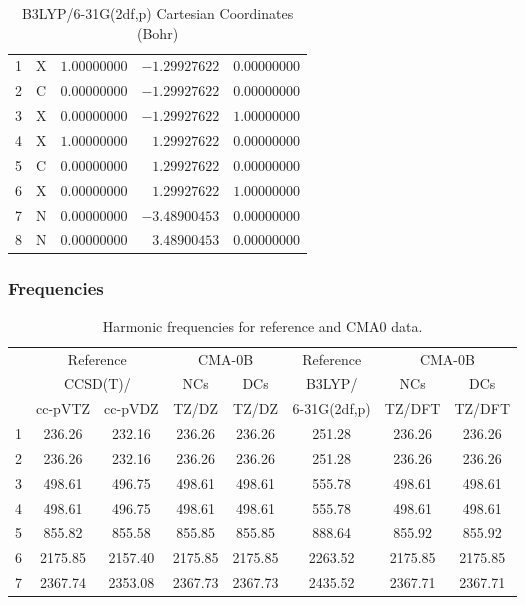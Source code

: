 \documentclass[10pt,oneside]{article}
\begin{document}
\begin{table}[h!]
\centering
\caption{B3LYP/6-31G(2df,p) Cartesian Coordinates (Bohr)}
\begin{tabular}{llrrr}
1  & X  & $ 1.00000000$ & $-1.29927622$ & $ 0.00000000$ \\
2  & C  & $ 0.00000000$ & $-1.29927622$ & $ 0.00000000$ \\
3  & X  & $ 0.00000000$ & $-1.29927622$ & $ 1.00000000$ \\
4  & X  & $ 1.00000000$ & $ 1.29927622$ & $ 0.00000000$ \\
5  & C  & $ 0.00000000$ & $ 1.29927622$ & $ 0.00000000$ \\
6  & X  & $ 0.00000000$ & $ 1.29927622$ & $ 1.00000000$ \\
7  & N  & $ 0.00000000$ & $-3.48900453$ & $ 0.00000000$ \\
8  & N  & $ 0.00000000$ & $ 3.48900453$ & $ 0.00000000$ \\
\end{tabular}
\end{table}

\clearpage

\subsubsection*{Frequencies}
\begin{table}[h!]
\centering
\caption{Harmonic frequencies for reference and CMA0 data.}
\begin{tabular}{cccccccc}
\toprule
{} & \multicolumn{2}{c}{Reference} & \multicolumn{2}{c}{CMA-0B} &    Reference & \multicolumn{2}{c}{CMA-0B} \\
{} & \multicolumn{2}{c}{CCSD(T)/} &     NCs &     DCs &       B3LYP/ &     NCs &     DCs \\
{} &   cc-pVTZ & cc-pVDZ &   TZ/DZ &   TZ/DZ & 6-31G(2df,p) &  TZ/DFT &  TZ/DFT \\
\midrule
1 &    236.26 &  232.16 &  236.26 &  236.26 &       251.28 &  236.26 &  236.26 \\
2 &    236.26 &  232.16 &  236.26 &  236.26 &       251.28 &  236.26 &  236.26 \\
3 &    498.61 &  496.75 &  498.61 &  498.61 &       555.78 &  498.61 &  498.61 \\
4 &    498.61 &  496.75 &  498.61 &  498.61 &       555.78 &  498.61 &  498.61 \\
5 &    855.82 &  855.58 &  855.85 &  855.85 &       888.64 &  855.92 &  855.92 \\
6 &   2175.85 & 2157.40 & 2175.85 & 2175.85 &      2263.52 & 2175.85 & 2175.85 \\
7 &   2367.74 & 2353.08 & 2367.73 & 2367.73 &      2435.52 & 2367.71 & 2367.71 \\
\bottomrule
\end{tabular}
\end{table}
\end{document}
